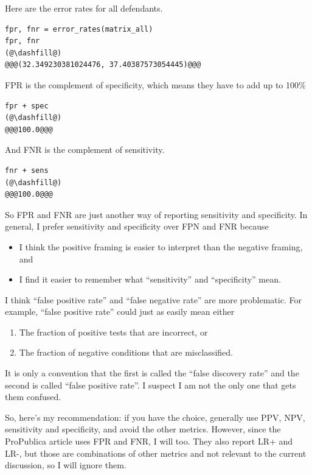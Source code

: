 Here are the error rates for all defendants.

\begin{lstlisting}[]
fpr, fnr = error_rates(matrix_all)
fpr, fnr
(@\dashfill@)
@@@(32.349230381024476, 37.40387573054445)@@@
\end{lstlisting}

FPR is the complement of specificity, which means they have to add up to
100\%

\begin{lstlisting}[]
fpr + spec
(@\dashfill@)
@@@100.0@@@
\end{lstlisting}

And FNR is the complement of sensitivity.

\begin{lstlisting}[]
fnr + sens
(@\dashfill@)
@@@100.0@@@
\end{lstlisting}

So FPR and FNR are just another way of reporting sensitivity and
specificity. In general, I prefer sensitivity and specificity over FPN
and FNR because

\begin{itemize}
\item
  I think the positive framing is easier to interpret than the negative
  framing, and
\item
  I find it easier to remember what ``sensitivity'' and ``specificity''
  mean.
\end{itemize}

I think ``false positive rate'' and ``false negative rate'' are more
problematic. For example, ``false positive rate'' could just as easily
mean either

\begin{enumerate}
\def\labelenumi{\arabic{enumi}.}
\item
  The fraction of positive tests that are incorrect, or
\item
  The fraction of negative conditions that are misclassified.
\end{enumerate}

It is only a convention that the first is called the ``false discovery
rate'' and the second is called ``false positive rate''. I suspect I am
not the only one that gets them confused.

So, here's my recommendation: if you have the choice, generally use PPV,
NPV, sensitivity and specificity, and avoid the other metrics. However,
since the ProPublica article uses FPR and FNR, I will too. They also
report LR+ and LR-, but those are combinations of other metrics and not
relevant to the current discussion, so I will ignore them.

